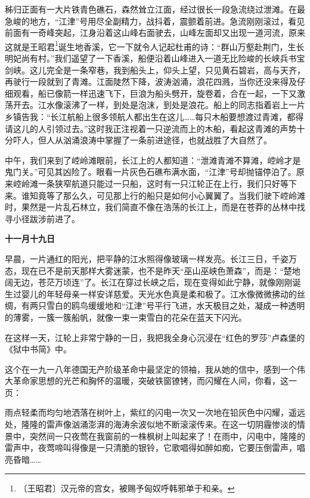 \documentclass[12pt,UTF-8,openany]{ctexbook}
\begin{document}
\begin{large}
    秭归正面有一大片铁青色礁石，森然耸立江面，经过很长一段急流绕过泄滩。在最急峻的地方，“江津”号用尽全副精力，战抖着，震颤着前进。急流刚刚滚过，看见前面有一奇峰突起，江身沿着这山峰右面驶去，山峰左面却又出现一道河流，原来这就是王昭君\footnote{〔王昭君〕汉元帝的宫女，被赐予匈奴呼韩邪单于和亲。}诞生地香溪，它一下就令人记起杜甫的诗：“群山万壑赴荆门，生长明妃尚有村。”我们遥望了一下香溪，船便沿着山峰进入一道无比险峻的长峡兵书宝剑峡。这儿完全是一条窄巷，我到船头上，仰头上望，只见黄石碧岩，高与天齐，再驶行一段就到了青滩。江面陡然下降，波涛汹涌，浪花四溅，当你还没来得及仔细观看，船已像箭一样迅速飞下，巨浪为船头劈开，旋卷着，合在一起，一下又激荡开去。江水像滚沸了一样，到处是泡沫，到处是浪花。船上的同志指着岩上一片乡镇告我：“长江航船上很多领航人都出生在这儿……每只木船要想渡过青滩，都得请这儿的人引领过去。”这时我正注视着一只逆流而上的木船，看起这青滩的声势十分吓人，但人从汹涌浪涛中掌握了一条前进途径，也就战胜了大自然了。
    
    中午，我们来到了崆岭滩眼前，长江上的人都知道：“泄滩青滩不算滩，崆岭才是鬼门关。”可见其凶险了。眼看一片灰色石礁布满水面，“江津”号却抛锚停泊了。原来崆岭滩一条狭窄航道只能过一只船，这时有一只江轮正在上行，我们只好等下来。谁知竟等了那么久，可见那上行的船只是如何小心翼翼了。当我们驶下崆岭滩时，果然是一片乱石林立，我们简直不像在浩荡的长江上，而是在苍莽的丛林中找寻小径跋涉前进了。
    
    \textbf{十一月十九日}
    
    早晨，一片通红的阳光，把平静的江水照得像玻璃一样发亮。长江三日，千姿万态，现在已不是前天那样大雾迷蒙，也不是昨天“巫山巫峡色萧森”，而是：“楚地阔无边，苍茫万顷连”了。长江在穿过长峡之后，现在变得如此宁静，就像刚刚诞生过婴儿的年轻母亲一样安详慈爱。天光水色真是柔和极了。江水像微微拂动的丝绸，有两只雪白的鸥鸟缓缓地和“江津”号平行飞进，水天极目之处，凝成一种透明的薄雾，一簇一簇船帆，就像一束一束雪白的花朵在蓝天下闪光。
    
    在这样一天，江轮上非常宁静的一日，我把我全身心沉浸在“红色的罗莎”卢森堡的《狱中书简》中。
    
    这个在一九一八年德国无产阶级革命中最坚定的领袖，我从她的信中，感到一个伟大革命家思想的光芒和胸怀的温暖，突破铁窗镣铐，而闪耀在人间，你看，这一页：
    
    雨点轻柔而均匀地洒落在树叶上，紫红的闪电一次又一次地在铅灰色中闪耀，遥远处，隆隆的雷声像汹涌澎湃的海涛余波似地不断滚滚传来。在这一切阴霾惨淡的情景中，突然间一只夜莺在我窗前的一株枫树上叫起来了！在雨中，闪电中，隆隆的雷声中，夜莺啼叫得像是一只清脆的银铃，它歌唱得如醉如痴，它要压倒雷声，唱亮昏暗……
    

\end{large}
\end{document}
